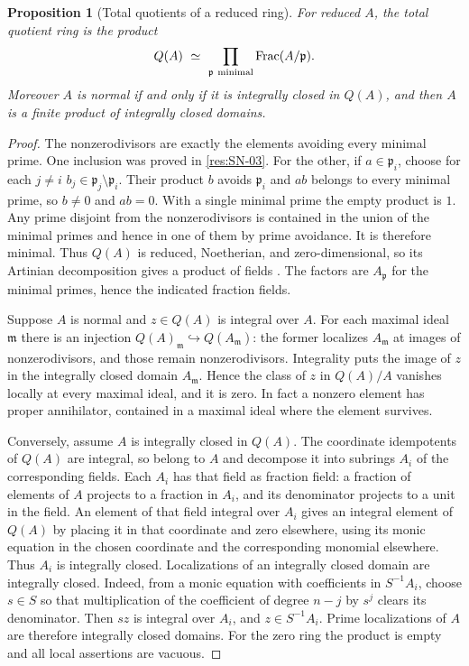 \documentclass[11pt,oneside,openany]{book}
\newtheorem{proposition}[theorem]{Proposition}
\theoremstyle{definition}
\theoremstyle{remark}
\begin{document}
\begin{proposition}[Total quotients of a reduced ring]\label{res:SN-04}
For reduced $A$, the total quotient ring is the product
\[
 Q(A)\ \simeq\ \prod_{\mathfrak p\ {\rm minimal}}\operatorname{Frac}(A/\mathfrak p).
\]
Moreover $A$ is normal if and only if it is integrally closed
in $Q(A)$, and then $A$ is a finite product of integrally closed
domains.
\end{proposition}
\begin{proof}
The nonzerodivisors are exactly the elements avoiding every
minimal prime. One inclusion was proved in \ref{res:SN-03}.
For the other, if $a\in\mathfrak p_i$, choose for each $j\ne i$
$b_j\in\mathfrak p_j\setminus\mathfrak p_i$. Their product
$b$ avoids $\mathfrak p_i$ and $ab$ belongs to every minimal
prime, so $b\ne0$ and $ab=0$. With a single minimal prime the
empty product is $1$.
Any prime disjoint from the nonzerodivisors is contained in
the union of the minimal primes and hence in one of them
by prime avoidance. It is therefore minimal. Thus $Q(A)$
is reduced, Noetherian, and zero-dimensional, so its
Artinian decomposition gives a product of fields
\cite[Chapter 3, ALG-03-C03-S02]{p103}. The factors are
$A_{\mathfrak p}$ for the minimal primes, hence the indicated
fraction fields.

Suppose $A$ is normal and $z\in Q(A)$ is integral over $A$.
For each maximal ideal $\mathfrak m$ there is an injection
$Q(A)_{\mathfrak m}\hookrightarrow Q(A_{\mathfrak m})$:
the former localizes $A_{\mathfrak m}$ at images of
nonzerodivisors, and those remain nonzerodivisors. Integrality
puts the image of $z$ in the integrally closed domain
$A_{\mathfrak m}$. Hence the class of $z$ in $Q(A)/A$ vanishes
locally at every maximal ideal, and it is zero. In fact a
nonzero element has proper annihilator, contained in a maximal
ideal where the element survives.

Conversely, assume $A$ is integrally closed in $Q(A)$. The
coordinate idempotents of $Q(A)$ are integral, so belong to
$A$ and decompose it into subrings $A_i$ of the corresponding
fields. Each $A_i$ has that field as fraction field: a
fraction of elements of $A$ projects to a fraction in $A_i$,
and its denominator projects to a unit in the field.
An element of that field integral over $A_i$ gives an integral
element of $Q(A)$ by placing it in that coordinate and zero
elsewhere, using its monic equation in the chosen coordinate
and the corresponding monomial elsewhere. Thus $A_i$ is
integrally closed. Localizations of an integrally closed domain
are integrally closed. Indeed, from a monic equation with
coefficients in $S^{-1}A_i$, choose $s\in S$ so that
multiplication of the coefficient of degree $n-j$ by $s^j$
clears its denominator. Then $sz$ is integral over $A_i$,
and $z\in S^{-1}A_i$. Prime localizations of $A$ are therefore
integrally closed domains. For the zero ring the product is
empty and all local assertions are vacuous.
\end{proof}
\end{document}
